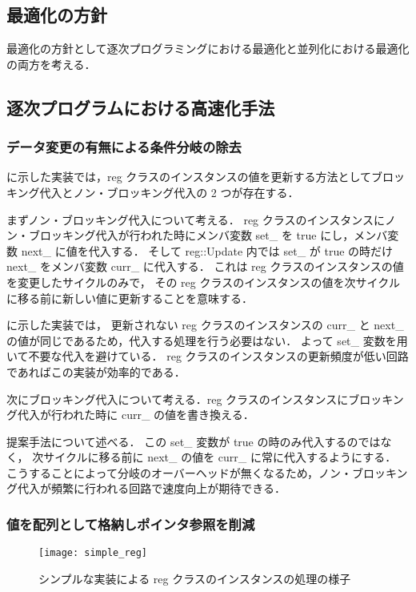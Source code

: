 \subsection{最適化の方針}

最適化の方針として逐次プログラミングにおける最適化と並列化における最適化の両方を考える．

\subsection{逐次プログラムにおける高速化手法}

\subsubsection{データ変更の有無による条件分岐の除去 \label{sss:no_set}}

 に示した実装では，reg クラスのインスタンスの値を更新する方法としてブロッキング代入とノン・ブロッキング代入の 2 つが存在する．

まずノン・ブロッキング代入について考える．
reg クラスのインスタンスにノン・ブロッキング代入が行われた時にメンバ変数 set\_ を true にし，メンバ変数 next\_ に値を代入する．
そして reg::Update 内では set\_ が true の時だけ next\_ をメンバ変数 curr\_ に代入する．
これは reg クラスのインスタンスの値を変更したサイクルのみで，
その reg クラスのインスタンスの値を次サイクルに移る前に新しい値に更新することを意味する．

 に示した実装では，
更新されない reg クラスのインスタンスの curr\_ と next\_ の値が同じであるため，代入する処理を行う必要はない．
よって set\_ 変数を用いて不要な代入を避けている．
reg クラスのインスタンスの更新頻度が低い回路であればこの実装が効率的である．

次にブロッキング代入について考える．reg クラスのインスタンスにブロッキング代入が行われた時に curr\_ の値を書き換える．

提案手法について述べる．
この set\_ 変数が true の時のみ代入するのではなく，
次サイクルに移る前に next\_ の値を curr\_ に常に代入するようにする．
こうすることによって分岐のオーバーヘッドが無くなるため，ノン・ブロッキング代入が頻繁に行われる回路で速度向上が期待できる．

\subsubsection{値を配列として格納しポインタ参照を削減} \label{sss:mem_copy}

\begin{figure}[t]
 \centering
 \texttt{[image: simple\_reg]}
 \caption{シンプルな実装による reg クラスのインスタンスの処理の様子}
 \label{fig:regs}
\end{figure}


